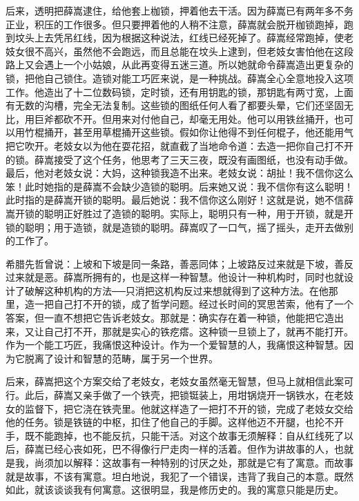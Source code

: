 后来，透明把薛嵩逮住，给他套上枷锁，押着他去干活。因为薛嵩已有两年多不务正业，积压的工作很多。但只要押着他的人稍不注意，薛嵩就会脱开枷锁跑掉，跑到坟头上去凭吊红线，因为根据这种说法，红线已经死掉了。薛嵩经常跑掉，使老妓女很不高兴，虽然他不会跑远，而且总能在坟头上逮到，但老妓女害怕他在这段路上又会遇上一个小姑娘，从此再变得五迷三道。所以她就命令薛嵩造出更复杂的锁，把他自己锁住。造锁对能工巧匠来说，是一种挑战。薛嵩全心全意地投入这项工作。他造出了十二位数码锁，定时锁，还有用钥匙的锁，那钥匙有两寸宽，上面有无数的沟槽，完全无法复制。这些锁的图纸任何人看了都要头晕，它们还坚固无比，用巨斧都砍不开。但用来对付他自己，却毫无用处。他可以用铁丝捅开，也可以用竹棍捅开，甚至用草棍捅开这些锁。假如你让他得不到任何棍子，他还能用气把它吹开。老妓女以为他在耍花招，就直截了当地命令道：去造一把你自己打不开的锁。薛嵩接受了这个任务，他思考了三天三夜，既没有画图纸，也没有动手做。最后，他对老妓女说：大妈，这种锁我造不出来。老妓女说：胡扯！我不信你这么笨！此时她指的是薛嵩不会缺少造锁的聪明。后来她又说：我不信你有这么聪明！此时指的是薛嵩开锁的聪明。最后她说：我不信你这么刚好！这就是说，她不信薛嵩开锁的聪明正好胜过了造锁的聪明。实际上，聪明只有一种，用于开锁，就是开锁的聪明；用于造锁，就是造锁的聪明。薛嵩叹了一口气，摇了摇头，走开去做别的工作了。 

希腊先哲曾说：上坡和下坡是同一条路，善恶同体；上坡路反过来就是下坡，善反过来就是恶。薛嵩所拥有的，也是这样一种智慧。他设计一种机构时，同时也就设计了破解这种机构的方法──只消把这机构反过来想就得到了这种方法。在他那里，造一把自己打不开的锁，成了哲学问题。经过长时间的冥思苦索，他有了一个答案，但一直不想把它告诉老妓女。那就是：确实存在着一种锁，他能把它造出来，又让自己打不开，那就是实心的铁疙瘩。这种锁一旦锁上了，就再不能打开。作为一个能工巧匠，我痛恨这种设计。作为一个爱智慧的人，我痛恨这种智慧。因为它脱离了设计和智慧的范畴，属于另一个世界。 

后来，薛嵩把这个方案交给了老妓女，老妓女虽然毫无智慧，但马上就相信此案可行。此后，薛嵩又亲手做了一个铁壳，把锁铤装上，用坩锅烧开一锅铁水，在老妓女的监督下，把它浇在铁壳里。他就这样造了一把打不开的锁，完成了老妓女交给他的任务。锁是铁链的中枢，扣住了他自己的手脚。这样他迈不开腿，也抡不开手，既不能跑掉，也不能反抗，只能干活。对这个故事无须解释：自从红线死了以后，薛嵩已经心丧如死，巴不得像行尸走肉一样的活着。但作为讲故事的人，也就是我，尚须加以解释：这故事有一种特别的讨厌之处，那就是它有了寓意。而故事就是故事，不该有寓意。坦白地说，我犯了一个错误，违背了我自己的本意。既然如此，就该谈谈我有何寓意。这很明显，我是修历史的。我的寓意只能是历史。 


